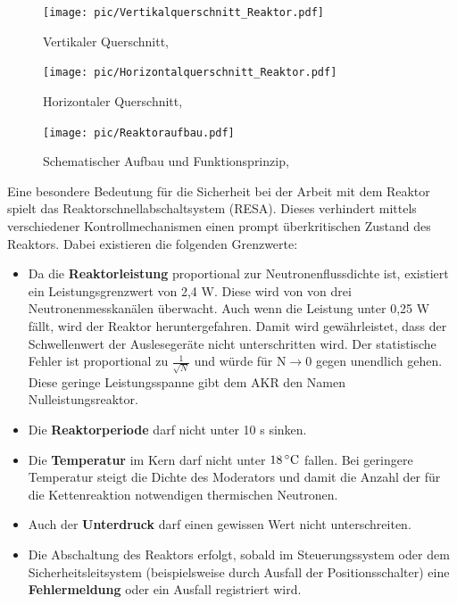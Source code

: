 	
	
	\begin{figure}[ht]
	\centering
	\texttt{[image: pic/Vertikalquerschnitt\_Reaktor.pdf]}
	\caption{Vertikaler Querschnitt, \cite{Aufbau} }
	\label{fig: Vertikaler Querschnitt}
	\end{figure}
	
	\begin{figure}[ht]
	\centering
	\texttt{[image: pic/Horizontalquerschnitt\_Reaktor.pdf]}
	\caption{Horizontaler Querschnitt, \cite{Aufbau}}
	\label{fig: Horizontaler Querschnitt}
	\end{figure}
	
	\begin{figure}[ht]
	\centering
	\texttt{[image: pic/Reaktoraufbau.pdf]}
	\caption{Schematischer Aufbau und Funktionsprinzip, \cite{start} }
	\label{fig: Reaktoraufbau}
	\end{figure}
	
	Eine besondere Bedeutung für die Sicherheit bei der Arbeit mit dem Reaktor spielt das Reaktorschnellabschaltsystem (RESA). Dieses verhindert mittels verschiedener Kontrollmechanismen einen prompt überkritischen Zustand des Reaktors. Dabei existieren die folgenden Grenzwerte:
	\begin{itemize}
	\item Da die \textbf{Reaktorleistung} proportional zur Neutronenflussdichte ist, existiert ein Leistungsgrenzwert von 2,4 W. Diese wird von von drei Neutronenmesskanälen überwacht. Auch wenn die Leistung unter 0,25 W fällt, wird der Reaktor heruntergefahren. Damit wird gewährleistet, dass der Schwellenwert der Auslesegeräte nicht unterschritten wird. Der statistische Fehler ist proportional zu $\frac{1}{\sqrt{N}}$ und würde für N$\rightarrow 0$ gegen unendlich gehen. Diese geringe Leistungsspanne gibt dem AKR den Namen Nulleistungsreaktor.
	\item Die \textbf{Reaktorperiode} darf nicht unter 10 s sinken.
	\item Die \textbf{Temperatur} im Kern darf nicht unter $\unit[18]{^{\circ}C}$ fallen. Bei geringere Temperatur steigt die Dichte des Moderators und damit die Anzahl der für die Kettenreaktion notwendigen thermischen Neutronen.
	\item Auch der \textbf{Unterdruck} darf einen gewissen Wert nicht unterschreiten.
	\item Die Abschaltung des Reaktors erfolgt, sobald im Steuerungssystem oder dem Sicherheitsleitsystem (beispielsweise durch Ausfall der Positionsschalter) eine \textbf{Fehlermeldung} oder ein Ausfall registriert wird.
	\end{itemize}
	
